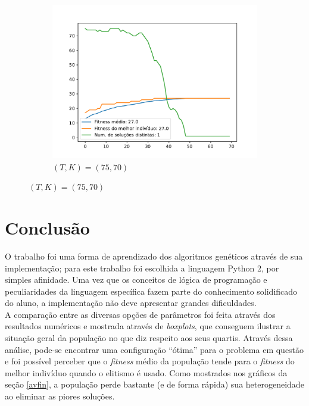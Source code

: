 \documentclass[11pt,a4paper]{article}
\begin{document}
\begin{figure}[!hb]
\begin{subfigure}[b]{0.33\textwidth}
		\includegraphics[width=\textwidth]{teste6_75_70.pdf}
		\caption{$(T,K)=(75,70)$}
	\end{subfigure}%
\end{figure}

\section{Conclusão}
O trabalho foi uma forma de aprendizado dos algoritmos genéticos através de sua implementação; para este trabalho foi escolhida a linguagem Python 2, por simples afinidade. Uma vez que os conceitos de lógica de programação e peculiaridades da linguagem específica fazem parte do conhecimento solidificado do aluno, a implementação não deve apresentar grandes dificuldades.\\

A comparação entre as diversas opções de parâmetros foi feita através dos resultados numéricos e mostrada através de \textit{boxplots}, que conseguem ilustrar a situação geral da população no que diz respeito aos seus quartis. Através dessa análise, pode-se encontrar uma configuração ``ótima'' para o problema em questão e foi possível perceber que o \textit{fitness} médio da população tende para o \textit{fitness} do melhor indivíduo quando o elitismo é usado. Como mostrados nos gráficos da seção \ref{avfin}, a população perde bastante (e de forma rápida) sua heterogeneidade ao eliminar as piores soluções.

\nocite{Python}
\nocite{Numpy}
\nocite{Scipy}
\nocite{Matplotlib}
\nocite{Greg}



\end{document}

